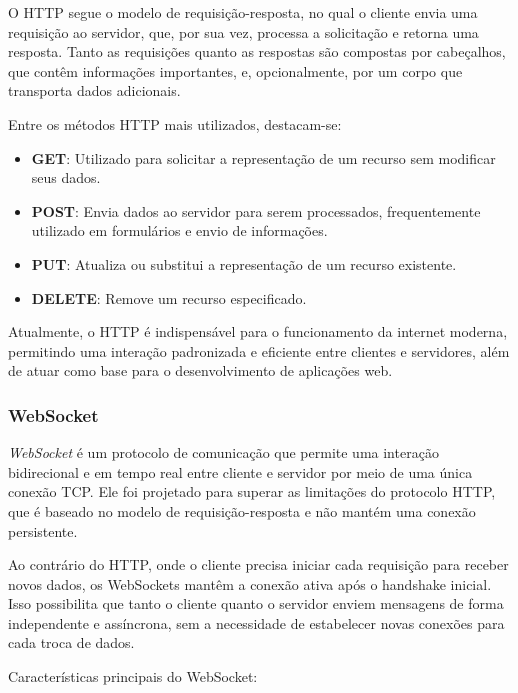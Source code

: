 O HTTP segue o modelo de requisição-resposta, no qual o cliente envia uma requisição ao servidor, que, por sua vez, processa a solicitação e retorna uma resposta. Tanto as requisições quanto as respostas são compostas por cabeçalhos, que contêm informações importantes, e, opcionalmente, por um corpo que transporta dados adicionais.

Entre os métodos HTTP mais utilizados, destacam-se:

\begin{itemize}
    \item \textbf{GET}: Utilizado para solicitar a representação de um recurso sem modificar seus dados.
    \item \textbf{POST}: Envia dados ao servidor para serem processados, frequentemente utilizado em formulários e envio de informações.
    \item \textbf{PUT}: Atualiza ou substitui a representação de um recurso existente.
    \item \textbf{DELETE}: Remove um recurso especificado.
\end{itemize}

Atualmente, o HTTP é indispensável para o funcionamento da internet moderna, permitindo uma interação padronizada e eficiente entre clientes e servidores, além de atuar como base para o desenvolvimento de aplicações web.

\subsubsection{WebSocket}

\emph{WebSocket} é um protocolo de comunicação que permite uma interação bidirecional e em tempo real entre cliente e servidor por meio de uma única conexão TCP. Ele foi projetado para superar as limitações do protocolo HTTP, que é baseado no modelo de requisição-resposta e não mantém uma conexão persistente.\cite{ws-standard}

Ao contrário do HTTP, onde o cliente precisa iniciar cada requisição para receber novos dados, os WebSockets mantêm a conexão ativa após o handshake inicial. Isso possibilita que tanto o cliente quanto o servidor enviem mensagens de forma independente e assíncrona, sem a necessidade de estabelecer novas conexões para cada troca de dados. 

Características principais do WebSocket:

